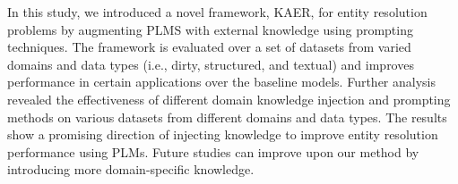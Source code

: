 
In this study, we introduced a novel framework, KAER, for entity resolution problems by augmenting PLMS with external knowledge using prompting techniques. 
The framework is evaluated over a set of datasets from varied domains and data types (i.e., dirty, structured, and textual) and improves performance in certain applications over the baseline models. 
Further analysis revealed the effectiveness of different domain knowledge injection and prompting methods on various datasets from different domains and data types.
The results show a promising direction of injecting knowledge to improve entity resolution performance using PLMs. 
Future studies can improve upon our method by introducing more domain-specific knowledge. 